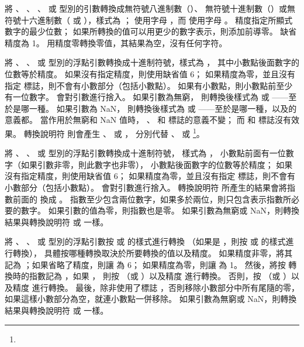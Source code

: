 {{
將 、 、 、
  或  型別的引數轉換成無符號八進制數（）、
無符號十進制數（）或無符號十六進制數（ 或 ），樣式為 ；
 使用字母 ，而  使用字母 。
精度指定所顯式數字的最少位數；
如果所轉換的值可以用更少的數字表示，則添加前導零。
缺省精度為 1。
用精度零轉換零值，其結果為空，沒有任何字符。
\stopclSpecifier

將 、 、 
 或  型別的浮點引數轉換成十進制符號，樣式為 ，
其中小數點後面數字的位數等於精度。
如果沒有指定精度，則使用缺省值 6；
如果精度為零，並且沒有指定 \cemp{#} 標誌，則不會有小數部分（包括小數點）。
如果有小數點，則小數點前至少有一位數字。
會對引數進行捨入。
如果引數為無窮，
則轉換後樣式為  或 ——至於是哪一種。
如果引數為 NaN，
則轉換後樣式為  或 
——至於是哪一種，以及的意義都。
\startbuffer
當作用於無窮和 NaN 值時， \cemp{-}、 \cemp{+} 和  標誌的意義不變；
而 \cemp{#} 和  標誌沒有效果。
\stopbuffer
轉換說明符  則會產生 、  或 ，
分別代替 、  或 \footnote{\getbuffer}。
\stopclSpecifier

將 、 、 
 或  型別的浮點引數轉換成十進制符號，
樣式為 ，
小數點前面有一位數字（如果引數非零，則此數字也非零），
小數點後面數字的位數等於精度；
如果沒有指定精度，則使用缺省值 6；
如果精度為零，並且沒有指定 \cemp{#} 標誌，則不會有小數部分（包括小數點）。
會對引數進行捨入。
轉換說明符  所產生的結果會將指數前面的  換成 。
指數至少包含兩位數字，如果多於兩位，則只包含表示指數所必要的數字。
如果引數的值為零，則指數也是零。
如果引數為無窮或 NaN，則轉換結果與轉換說明符  或  一樣。
\stopclSpecifier

將 、 、 
 或  型別的浮點引數按  或  的樣式進行轉換
（如果是 ，則按  或  的樣式進行轉換），
具體按哪種轉換取決於所要轉換的值以及精度。
如果精度非零，將其記為 ；如果省略了精度，則讓  為 6；
如果精度為零，則讓  為 1。
然後，將按  轉換時的指數記為 ，如果 ，
則按 （或 ）以及精度  進行轉換。
否則，按 （或 ）以及精度  進行轉換。
最後，除非使用了標誌 \cemp{#}，否則移除小數部分中所有尾隨的零，
如果這樣小數部分為空，就連小數點一併移除。
如果引數為無窮或 NaN，則轉換結果與轉換說明符  或  一樣。
\stopclSpecifier

}}
